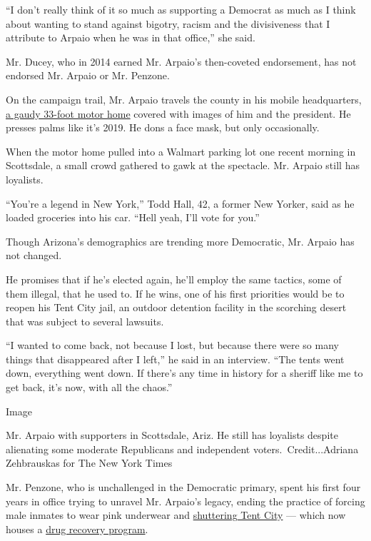 ``I don't really think of it so much as supporting a Democrat as much as
I think about wanting to stand against bigotry, racism and the
divisiveness that I attribute to Arpaio when he was in that office,''
she said.

Mr. Ducey, who in 2014 earned Mr. Arpaio's then-coveted endorsement, has
not endorsed Mr. Arpaio or Mr. Penzone.

On the campaign trail, Mr. Arpaio travels the county in his mobile
headquarters,
\href{https://www.fhtimes.com/news/local_news/arpaio-campaign-hits-the-road/article_4a6b2e6a-c07d-11ea-8db5-ab2ad6fe3a1f.html}{a
gaudy 33-foot motor home} covered with images of him and the president.
He presses palms like it's 2019. He dons a face mask, but only
occasionally.

When the motor home pulled into a Walmart parking lot one recent morning
in Scottsdale, a small crowd gathered to gawk at the spectacle. Mr.
Arpaio still has loyalists.

``You're a legend in New York,'' Todd Hall, 42, a former New Yorker,
said as he loaded groceries into his car. ``Hell yeah, I'll vote for
you.''

Though Arizona's demographics are trending more Democratic, Mr. Arpaio
has not changed.

He promises that if he's elected again, he'll employ the same tactics,
some of them illegal, that he used to. If he wins, one of his first
priorities would be to reopen his Tent City jail, an outdoor detention
facility in the scorching desert that was subject to several lawsuits.

``I wanted to come back, not because I lost, but because there were so
many things that disappeared after I left,'' he said in an interview.
``The tents went down, everything went down. If there's any time in
history for a sheriff like me to get back, it's now, with all the
chaos.''

Image

Mr. Arpaio with supporters in Scottsdale, Ariz. He still has loyalists
despite alienating some moderate Republicans and independent
voters.~Credit...Adriana Zehbrauskas for The New York Times

Mr. Penzone, who is unchallenged in the Democratic primary, spent his
first four years in office trying to unravel Mr. Arpaio's legacy, ending
the practice of forcing male inmates to wear pink underwear and
\href{https://www.nytimes.com/2017/04/04/us/arpaio-tent-city-maricopa-sheriff-penzone.html}{shuttering
Tent City} --- which now houses a
\href{https://kjzz.org/content/550808/former-tent-city-jail-facility-house-drug-treatment-program}{drug
recovery program}.

